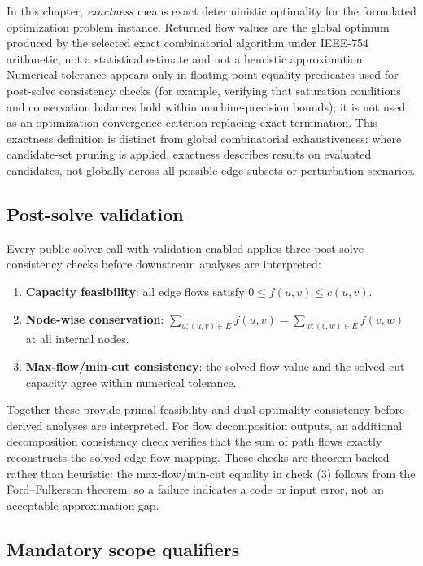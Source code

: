 \documentclass[12pt]{report}
\begin{document}
In this chapter, \emph{exactness} means exact deterministic optimality for the formulated optimization problem instance. Returned flow values are the global optimum produced by the selected exact combinatorial algorithm under IEEE-754 arithmetic, not a statistical estimate and not a heuristic approximation. Numerical tolerance appears only in floating-point equality predicates used for post-solve consistency checks (for example, verifying that saturation conditions and conservation balances hold within machine-precision bounds); it is not used as an optimization convergence criterion replacing exact termination. This exactness definition is distinct from global combinatorial exhaustiveness: where candidate-set pruning is applied, exactness describes results on evaluated candidates, not globally across all possible edge subsets or perturbation scenarios.

\subsection{Post-solve validation}

Every public solver call with validation enabled applies three post-solve consistency checks before downstream analyses are interpreted:

\begin{enumerate}
    \item \textbf{Capacity feasibility}: all edge flows satisfy $0\le f(u,v)\le c(u,v)$.
    \item \textbf{Node-wise conservation}: $\sum_{u:(u,v)\in E} f(u,v) = \sum_{w:(v,w)\in E} f(v,w)$ at all internal nodes.
    \item \textbf{Max-flow/min-cut consistency}: the solved flow value and the solved cut capacity agree within numerical tolerance.
\end{enumerate}

Together these provide primal feasibility and dual optimality consistency before derived analyses are interpreted. For flow decomposition outputs, an additional decomposition consistency check verifies that the sum of path flows exactly reconstructs the solved edge-flow mapping. These checks are theorem-backed rather than heuristic: the max-flow/min-cut equality in check (3) follows from the Ford--Fulkerson theorem, so a failure indicates a code or input error, not an acceptable approximation gap.

\subsection{Mandatory scope qualifiers}
\end{document}
